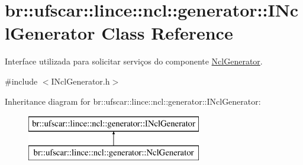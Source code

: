\hypertarget{classbr_1_1ufscar_1_1lince_1_1ncl_1_1generator_1_1INclGenerator}{
\section{br::ufscar::lince::ncl::generator::INclGenerator Class Reference}
\label{classbr_1_1ufscar_1_1lince_1_1ncl_1_1generator_1_1INclGenerator}
}


Interface utilizada para solicitar serviços do componente \hyperlink{classbr_1_1ufscar_1_1lince_1_1ncl_1_1generator_1_1NclGenerator}{NclGenerator}.  




{\ttfamily \#include $<$INclGenerator.h$>$}

Inheritance diagram for br::ufscar::lince::ncl::generator::INclGenerator:\begin{figure}[H]
\begin{center}
\leavevmode
\includegraphics[height=2cm]{classbr_1_1ufscar_1_1lince_1_1ncl_1_1generator_1_1INclGenerator}
\end{center}
\end{figure}
